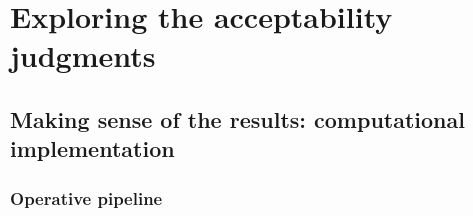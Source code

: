 \setchapterpreamble[u]{\margintoc}
\chapter{Exploring the acceptability judgments}


\section{Making sense of the results: computational implementation} 

\subsection{Operative pipeline} 

